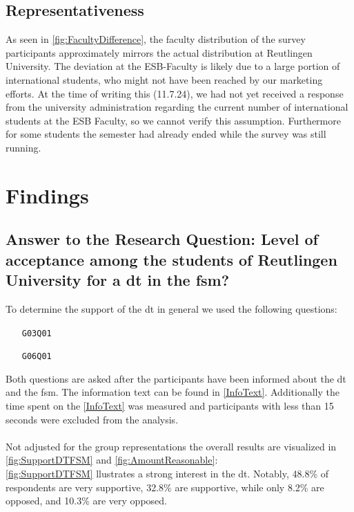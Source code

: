 \subsection{Representativeness}
\begin{multicols}{1}
    
    \columnbreak
    {
        As seen in \ref{fig:FacultyDifference}, the faculty distribution of the survey participants approximately mirrors the actual distribution at Reutlingen University.
        The deviation at the ESB-Faculty is likely due to a large portion of international students, who might not have been reached by our marketing efforts. At the time of writing this (11.7.24), we had not yet received a response from the university administration regarding the current number of international students at the ESB Faculty, so we cannot verify this assumption.
        Furthermore for some students the semester had already ended while the survey was still running.
    }
\end{multicols}

\pagebreak
\section{Findings}
\subsection{Answer to the Research Question: Level of acceptance among the students of Reutlingen University for a \gls{dt} in the \gls{fsm}?}
\begin{center}
\end{center}

To determine the support of the \gls{dt} in general we used the following questions:

\begin{enumerate}
    \item[\texttt{G03Q01}] 
    \item[\texttt{G06Q01}] 
\end{enumerate}
Both questions are asked after the participants have been informed about the \gls{dt} and the \gls{fsm}. The information text can be found in \ref{InfoText}. Additionally the time spent on the \ref*{InfoText} was measured and participants with less than 15 seconds were excluded from the analysis.\\\\
Not adjusted for the group representations the overall results are visualized in \ref{fig:SupportDTFSM} and \ref{fig:AmountReasonable}:\\
\ref{fig:SupportDTFSM} llustrates a strong interest in the \gls{dt}. Notably, 48.8\% of respondents are very supportive, 32.8\% are supportive, while only 8.2\% are opposed, and 10.3\% are very opposed.

